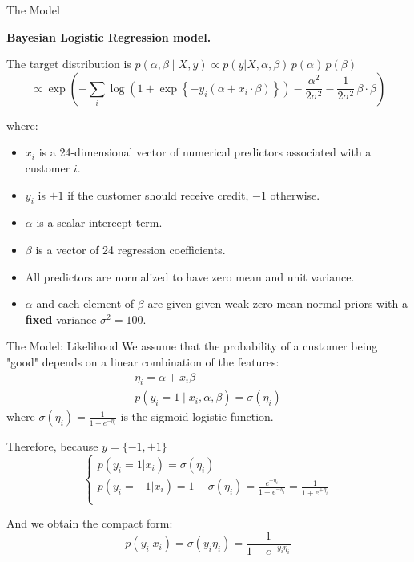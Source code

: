 \documentclass[aspectratio=43]{beamer}
\begin{document}
\begin{frame}{The Model}
	\begin{center}
		\textbf{Bayesian Logistic Regression model.}
	\end{center}
	
	The target distribution is $p(\alpha, \beta \mid X, y) \propto p(y|X, \alpha, \beta) \, p(\alpha) \, p(\beta)$
	\begin{equation*}
		\propto \exp\left(
		-\sum_{i}\log\!\left(1+\exp\!\left\{-y_i\left(\alpha + x_i \cdot \beta\right)\right\}\right)
		-\frac{\alpha^2}{2\sigma^2}
		-\frac{1}{2\sigma^2}\,\beta \cdot \beta
		\right)
	\end{equation*}
	
	where:
	\begin{itemize}
		\item $x_i$ is a 24-dimensional vector of numerical predictors associated with a customer $i$.
		\item $y_i$ is $+1$ if the customer should receive credit, $-1$ otherwise.
		\item $\alpha$ is a scalar intercept term.
		\item $\beta$ is a vector of 24 regression coefficients.
		\item All predictors are normalized to have zero mean and unit variance.
		\item $\alpha$ and each element of $\beta$ are given given weak zero-mean normal priors with a \textbf{fixed} variance $\sigma^2 = 100$.
		
	\end{itemize}
	
\end{frame}

\begin{frame}{The Model: Likelihood}
	We assume that the probability of a customer being "good" depends on a linear combination of the features: 
	\begin{gather*}
		\eta_i = \alpha + x_i \beta \\
		p(y_i = 1 \mid x_i, \alpha, \beta) = \sigma(\eta_i)
	\end{gather*}
	where $\sigma(\eta_i) = \frac{1}{1 + e^{-\eta_i}}$ is the sigmoid logistic function.
	
	Therefore, because $y = \{-1, +1\}$
	$$
	\begin{cases}
		p(y_i = 1 | x_i) = \sigma(\eta_i) \\
		p(y_i = -1 | x_i) = 1 - \sigma(\eta_i) = \frac{e^{-\eta_i}}{1+e^{-\eta_i}} = \frac{1}{1 + e^{+\eta_i}}\\
	\end{cases}
	$$
	
	And we obtain the compact form:
	\begin{equation*}
		p(y_i | x_i) = \sigma(y_i \eta_i) = \frac{1}{1 + e^{-y_i \eta_i}}
	\end{equation*}
\end{frame}
\end{document}
